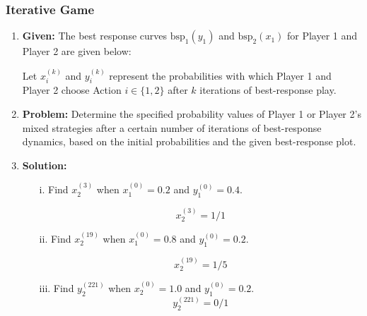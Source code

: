 \subsubsection{Iterative Game}
\begin{example}
    \begin{enumerate}

        \item \textbf{Given:} The best response curves $\text{bsp}_1(y_1)$ and $\text{bsp}_2(x_1)$ for Player 1 and Player 2 are given below:
    
    
        Let $x_i^{(k)}$ and $y_i^{(k)}$ represent the probabilities with which Player 1 and Player 2 choose Action $i \in \{1, 2\}$ after $k$ iterations of best-response play.
    
        \item \textbf{Problem:} Determine the specified probability values of Player 1 or Player 2's mixed strategies after a certain number of iterations of best-response dynamics, based on the initial probabilities and the given best-response plot.
    
        \item \textbf{Solution:}
        \begin{enumerate}
            \item[i.] Find $x_2^{(3)}$ when $x_1^{(0)} = 0.2$ and $y_1^{(0)} = 0.4$.

            \[
            x_2^{(3)} = 1/1
            \]
    
            \item[ii.] Find $x_2^{(19)}$ when $x_1^{(0)} = 0.8$ and $y_1^{(0)} = 0.2$.
    
            \[
            x_2^{(19)} = 1/5
            \]
    
            \item[iii.] Find $y_2^{(221)}$ when $x_2^{(0)} = 1.0$ and $y_1^{(0)} = 0.2$.
            \[
            y_2^{(221)} = 0/1
            \]
        \end{enumerate}
    
    \end{enumerate}
\end{example}

